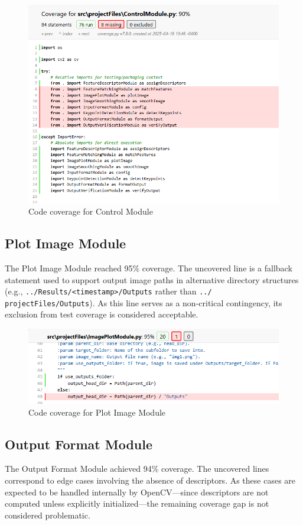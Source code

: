 \documentclass[12pt, titlepage]{article}
\begin{document}
\begin{figure}[h!]
  \centering
  \includegraphics[width=0.95\linewidth]{images/cov_CTRL.png}
  \caption{Code coverage for Control Module}
  \label{Coverage_Control}
\end{figure}

\subsection{Plot Image Module}
The Plot Image Module reached 95\% coverage. The uncovered line is a fallback statement used to support output image paths in alternative directory structures (e.g., \texttt{../Results/<timestamp>/Outputs} rather than \texttt{../ projectFiles/Outputs}). As this line serves as a non-critical contingency, its exclusion from test coverage is considered acceptable.

\begin{figure}[h!]
  \centering
  \includegraphics[width=0.95\linewidth]{images/cov_PLOT.png}
  \caption{Code coverage for Plot Image Module}
  \label{Coverage_Plot}
\end{figure}

\subsection{Output Format Module}
The Output Format Module achieved 94\% coverage. The uncovered lines correspond to edge cases involving the absence of descriptors. As these cases are expected to be handled internally by OpenCV—since descriptors are not computed unless explicitly initialized—the remaining coverage gap is not considered problematic.
\end{document}
